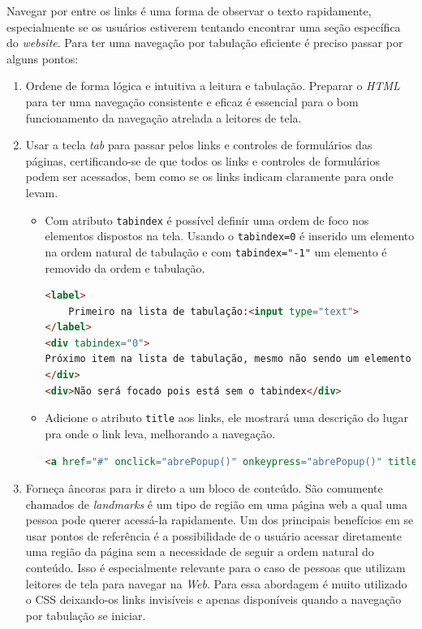 {{{Navegar por entre os links é uma forma de observar o texto rapidamente, especialmente se os usuários estiverem tentando encontrar uma seção específica do \textit{website}. Para ter uma navegação por tabulação eficiente é preciso passar por alguns pontos: 
\begin{enumerate}
    \item Ordene de forma lógica e intuitiva a leitura e tabulação. Preparar o \textit{HTML} para ter uma navegação consistente e eficaz é essencial para o bom funcionamento da navegação atrelada a leitores de tela. 
    \item Usar a tecla \textit{tab} para passar pelos links e controles de formulários
    das páginas, certificando-se de que todos os links e controles de
    formulários podem ser acessados, bem como se os links indicam
    claramente para onde levam. 
    \begin{itemize}
        \item Com atributo \lstinline{tabindex} é possível definir uma ordem de foco nos elementos dispostos na tela. Usando o \lstinline{tabindex=0} é inserido um elemento na ordem natural de tabulação e com \lstinline{tabindex="-1"} um elemento é removido da ordem e tabulação.
        \newpage
{\begin{lstlisting}[language=html,caption=Uso do atributo tabindex]
<label>
    Primeiro na lista de tabulação:<input type="text">
</label>
<div tabindex="0">
Próximo item na lista de tabulação, mesmo não sendo um elemento que receberia o foco natural
</div>
<div>Não será focado pois está sem o tabindex</div>
\end{lstlisting}}
        \item Adicione o atributo \lstinline{title} aos links, ele mostrará uma descrição do lugar pra onde o link leva, melhorando a navegação.
{\begin{lstlisting}[language=html,caption=usando o atributo title]
<a href="#" onclick="abrePopup()" onkeypress="abrePopup()" title="Abre uma janela pop-up com Javascript">Ver mais informações</a>
\end{lstlisting}}
    \end{itemize}
    \item Forneça âncoras para ir direto a um bloco de conteúdo. São comumente chamados de \textit{landmarks} é um tipo de região em uma página web a qual uma pessoa pode querer acessá-la rapidamente. Um dos principais benefícios em se usar pontos de referência é a possibilidade de o usuário acessar diretamente uma região da página sem a necessidade de seguir a ordem natural do conteúdo. Isso é especialmente relevante para o caso de pessoas que utilizam leitores de tela para navegar na \textit{Web}. Para essa abordagem é muito utilizado o CSS deixando-os links invisíveis e apenas disponíveis quando a navegação por tabulação se iniciar. 

\end{enumerate}}}}
